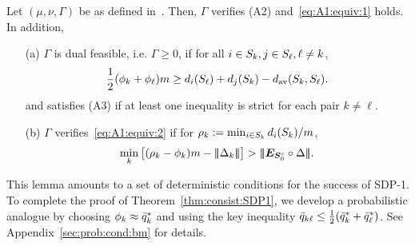 \begin{lem}\label{LEM:VALID:GAMMA:SDP1}
  Let $(\mu,\nu,\Gamma)$ be as defined in~.  Then, $\Gamma$ verifies (A2) and~\eqref{eq:A1:equiv:1} holds. In addition, 
  \begin{itemize}
  \setlength\itemsep{0em}
    \item[(a)] $\Gamma$ is dual feasible, i.e. $\Gamma \ge 0$, if for all $i\in S_{k}, j \in S_{\ell}, \ell \neq k$, 
    \begin{align}\label{eq:mu:low:bound:SDP1}
       \frac12(\phi_k + \phi_\ell) m \ge d_{i}(S_{\ell})  + d_{j}(S_{k}) - d_{\text{av}}(S_{k},S_{\ell}).
    \end{align}
    and satisfies (A3) if at least one inequality is strict for each pair $k \neq \ell$.
    \item[(b)] $\Gamma$ verifies~\eqref{eq:A1:equiv:2} if for $\rho_k := \min_{i \in S_{k}} d_{i}(S_{k}) /m$,
    \begin{equation}\label{eq:Delta:up:bound:SDP1}
      \min_k \big[ (\rho_k - \mubar_k) m - \mnorm{\Delta_k}\big] > \mnorm{\onem_{\Stru^c} \circ \Delta}.
    \end{equation}
  \end{itemize}
\end{lem}
This lemma amounts to a set of deterministic conditions for the success of SDP-1.   To complete the proof of Theorem~\ref{thm:consist:SDP1}, we develop a probabilistic analogue by choosing $\phi_k \approx \bar{q}^*_k$ and using the key inequality $ \bar{q}_{k \ell} \le \frac12 (\bar{q}^*_k + \bar{q}^*_\ell)$. See Appendix~\ref{sec:prob:cond:bm} for details. 
  


